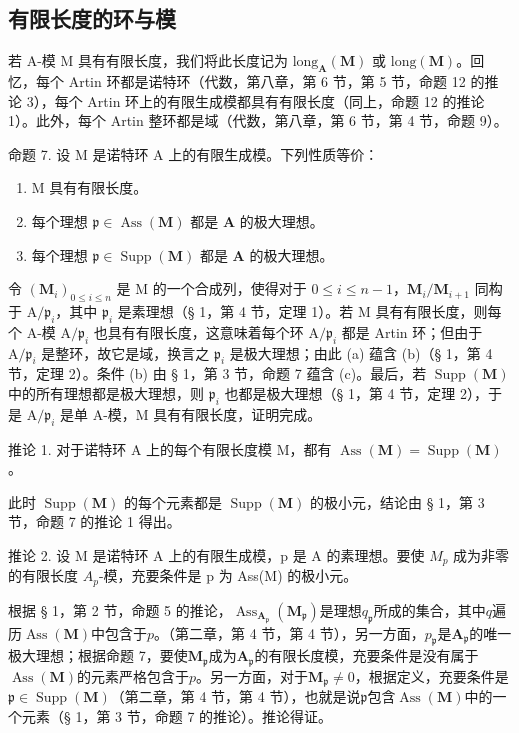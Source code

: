 \subsection{有限长度的环与模}

若 A-模 M 具有有限长度，我们将此长度记为 \(\text{long}_{\mathbf{A}}(\mathbf{M})\) 或 \(\text{long}(\mathbf{M})\)。回忆，每个 Artin 环都是诺特环（代数，第八章，第 6 节，第 5 节，命题 12 的推论 3），每个 Artin 环上的有限生成模都具有有限长度（同上，命题 12 的推论 1）。此外，每个 Artin 整环都是域（代数，第八章，第 6 节，第 4 节，命题 9）。

命题 7. 设 M 是诺特环 A 上的有限生成模。下列性质等价：

\begin{enumerate}
\def\labelenumi{(\alph{enumi})}
\item
  M 具有有限长度。
\item
  每个理想 \(\mathfrak{p} \in \operatorname{Ass}(\mathbf{M})\) 都是 \(\mathbf{A}\) 的极大理想。
\item
  每个理想 \(\mathfrak{p} \in \operatorname{Supp}(\mathbf{M})\) 都是 \(\mathbf{A}\) 的极大理想。
\end{enumerate}

令 \((\mathbf{M}_i)_{0\leqslant i\leqslant n}\) 是 M 的一个合成列，使得对于 \(0\leqslant i\leqslant n - 1\)，\(\mathbf{M}_i / \mathbf{M}_{i + 1}\) 同构于 \(\mathrm{A} / \mathfrak{p}_i\)，其中 \(\mathfrak{p}_i\) 是素理想（§ 1，第 4 节，定理 1）。若 M 具有有限长度，则每个 A-模 \(\mathrm{A} / \mathfrak{p}_i\) 也具有有限长度，这意味着每个环 \(\mathrm{A} / \mathfrak{p}_i\) 都是 Artin 环；但由于 \(\mathrm{A} / \mathfrak{p}_i\) 是整环，故它是域，换言之 \(\mathfrak{p}_i\) 是极大理想；由此 (a) 蕴含 (b)（§ 1，第 4 节，定理 2）。条件 (b) 由 § 1，第 3 节，命题 7 蕴含 (c)。最后，若 \(\operatorname {Supp}(\mathbf{M})\) 中的所有理想都是极大理想，则 \(\mathfrak{p}_i\) 也都是极大理想（§ 1，第 4 节，定理 2），于是 \(\mathrm{A} / \mathfrak{p}_i\) 是单 A-模，M 具有有限长度，证明完成。

推论 1. 对于诺特环 A 上的每个有限长度模 M，都有 \(\operatorname{Ass}(\mathbf{M}) = \operatorname{Supp}(\mathbf{M})\)。

此时 \(\operatorname{Supp}(\mathbf{M})\) 的每个元素都是 \(\operatorname{Supp}(\mathbf{M})\) 的极小元，结论由 § 1，第 3 节，命题 7 的推论 1 得出。

推论 2. 设 M 是诺特环 A 上的有限生成模，p 是 A 的素理想。要使 \(M_{p}\) 成为非零的有限长度 \(A_{p}\)-模，充要条件是 p 为 Ass(M) 的极小元。

根据 § 1，第 2 节，命题 5 的推论，\(\operatorname{Ass}_{\mathbf{A}_{\mathfrak{p}}}(\mathbf{M}_{\mathfrak{p}})\)是理想\(q_{\mathfrak{p}}\)所成的集合，其中\(q\)遍历\(\operatorname{Ass}(\mathbf{M})\)中包含于\(p\)。（第二章，第 4 节，第 4 节），另一方面，\(p_{\mathfrak{p}}\)是\(\mathbf{A}_{\mathfrak{p}}\)的唯一极大理想；根据命题 7，要使\(\mathbf{M}_{\mathfrak{p}}\)成为\(\mathbf{A}_{\mathfrak{p}}\)的有限长度模，充要条件是没有属于\(\operatorname{Ass}(\mathbf{M})\)的元素严格包含于\(p\)。另一方面，对于\(\mathbf{M}_{\mathfrak{p}} \neq 0\)，根据定义，充要条件是\(\mathfrak{p} \in \operatorname{Supp}(\mathbf{M})\)（第二章，第 4 节，第 4 节），也就是说\(\mathfrak{p}\)包含\(\operatorname{Ass}(\mathbf{M})\)中的一个元素（§ 1，第 3 节，命题 7 的推论）。推论得证。

